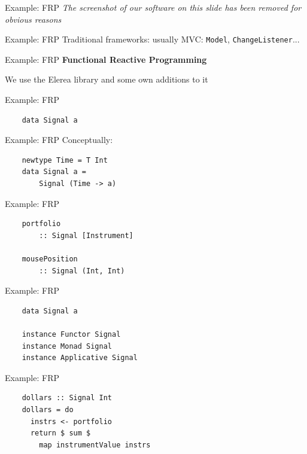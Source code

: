\documentclass[20pt]{beamer}
\newcommand{\vspaced}{
    \vspace{5mm}
}
\begin{document}
\begin{frame}{Example: FRP}
    \emph{The screenshot of our software on this slide has been removed for
    obvious reasons}
\end{frame}

\begin{frame}{Example: FRP}
    Traditional frameworks: usually MVC: \texttt{Model},
    \texttt{ChangeListener}...
\end{frame}

\begin{frame}{Example: FRP}
    \textbf{Functional Reactive Programming} \\
    \vspaced
    We use the Elerea library and some own additions to it
\end{frame}

\begin{frame}[fragile]{Example: FRP}
    \begin{lstlisting}
    data Signal a
    \end{lstlisting}
\end{frame}

\begin{frame}[fragile]{Example: FRP}
    Conceptually: \\
    \vspaced
    \begin{lstlisting}
    newtype Time = T Int
    data Signal a =
        Signal (Time -> a)
    \end{lstlisting}
\end{frame}

\begin{frame}[fragile]{Example: FRP}
    \begin{lstlisting}
    portfolio
        :: Signal [Instrument]

    mousePosition
        :: Signal (Int, Int)
    \end{lstlisting}
\end{frame}

\begin{frame}[fragile]{Example: FRP}
    \begin{lstlisting}
    data Signal a

    instance Functor Signal
    instance Monad Signal
    instance Applicative Signal
    \end{lstlisting}
\end{frame}

\begin{frame}[fragile]{Example: FRP}
    \begin{lstlisting}
    dollars :: Signal Int
    dollars = do
      instrs <- portfolio
      return $ sum $
        map instrumentValue instrs
    \end{lstlisting}
\end{frame}
\end{document}
